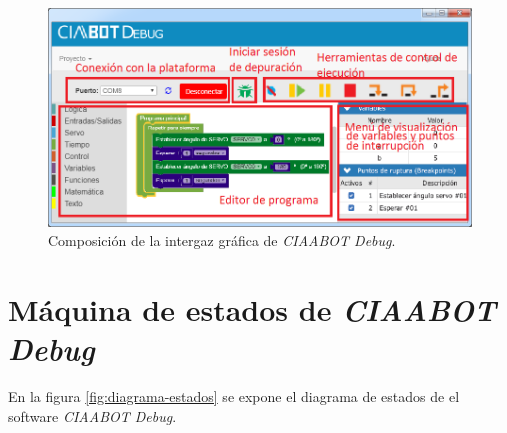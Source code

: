 \begin{figure}[!htbp]
	\begin{center}  %
		\includegraphics[width=15cm]{./Figures/CIAABOT-DEBUG-GUI-3.png}
		\par\caption{Composición de la intergaz gráfica de \emph{CIAABOT Debug}.}\label{fig:debug-modos}
	\end{center}
\end{figure}


\section{Máquina de estados de \emph{CIAABOT Debug}}
\label{sec:Modos de funcionamiento}

En la figura \ref{fig:diagrama-estados} se expone el diagrama de estados de el software \emph{CIAABOT Debug}.


